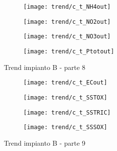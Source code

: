 \begin{sidewaysfigure}[h]\ContinuedFloat
	\renewcommand*\thesubfigure{(\arabic{subfigure})}
	\begin{subfigure}{0.49\textwidth}
		\texttt{[image: trend/c\_t\_NH4out]}
		\caption{}
		\centering
	\end{subfigure}
	\begin{subfigure}{0.49\textwidth}
		\texttt{[image: trend/c\_t\_NO2out]}
		\caption{}
		\centering
	\end{subfigure}

	\begin{subfigure}{0.49\textwidth}
		\texttt{[image: trend/c\_t\_NO3out]}
		\caption{}
		\centering
	\end{subfigure}
	\begin{subfigure}{0.49\textwidth}
		\texttt{[image: trend/c\_t\_Ptotout]}	
		\caption{}
		\centering
	\end{subfigure}
	\caption{Trend impianto B - parte 8}
\end{sidewaysfigure}

\begin{sidewaysfigure}[h]\ContinuedFloat
	\renewcommand*\thesubfigure{(\arabic{subfigure})}
	\begin{subfigure}{0.49\textwidth}
		\texttt{[image: trend/c\_t\_ECout]}
		\caption{}
		\centering
	\end{subfigure}
	\begin{subfigure}{0.49\textwidth}
		\texttt{[image: trend/c\_t\_SSTOX]}
		\caption{}
		\centering
	\end{subfigure}

	\begin{subfigure}{0.49\textwidth}
		\texttt{[image: trend/c\_t\_SSTRIC]}
		\caption{}
		\centering
	\end{subfigure}
	\begin{subfigure}{0.49\textwidth}
		\texttt{[image: trend/c\_t\_SSSOX]}	
		\caption{}
		\label{fig:c_t_SSSOX}
		\centering
	\end{subfigure}
	\caption{Trend impianto B - parte 9}
\end{sidewaysfigure}

